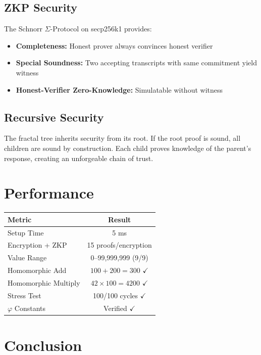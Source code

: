 \documentclass{article}
\begin{document}
\subsection{ZKP Security}

The Schnorr $\Sigma$-Protocol on secp256k1 provides:
\begin{itemize}
\item \textbf{Completeness:} Honest prover always convinces honest verifier
\item \textbf{Special Soundness:} Two accepting transcripts with same commitment yield witness
\item \textbf{Honest-Verifier Zero-Knowledge:} Simulatable without witness
\end{itemize}

\subsection{Recursive Security}

The fractal tree inherits security from its root. If the root proof is sound, all children are sound by construction. Each child proves knowledge of the parent's response, creating an unforgeable chain of trust.

\section{Performance}

\begin{center}
\begin{tabular}{|l|c|}
\hline
\textbf{Metric} & \textbf{Result} \\
\hline
Setup Time & 5 ms \\
Encryption + ZKP & 15 proofs/encryption \\
Value Range & 0--99,999,999 (9/9) \\
Homomorphic Add & $100+200=300$ $\checkmark$ \\
Homomorphic Multiply & $42\times100=4200$ $\checkmark$ \\
Stress Test & 100/100 cycles $\checkmark$ \\
$\varphi$ Constants & Verified $\checkmark$ \\
\hline
\end{tabular}
\end{center}

\section{Conclusion}
\end{document}
